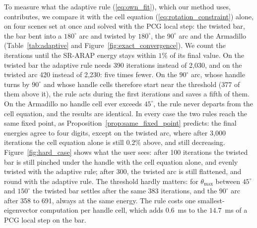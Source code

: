 \documentclass{birkjour}
\theoremstyle{remark}
\numberwithin{equation}{section}
\begin{document}
To measure what the adaptive rule (\ref{eq:own_fit}), which our method uses, contributes, we compare it with the cell equation (\ref{eq:rotation_constraint}) alone, on four scenes set at once and solved with the PCG local step: the twisted bar, the bar bent into a $180^\circ$ arc and twisted by $180^\circ$, the $90^\circ$ arc and the Armadillo (Table~\ref{tab:adaptive} and Figure~\ref{fig:exact_convergence}). We count the iterations until the SR-ARAP energy stays within $1\%$ of its final value. On the twisted bar the adaptive rule needs 390 iterations instead of 2{,}030, and on the twisted arc 420 instead of 2{,}230: five times fewer. On the $90^\circ$ arc, whose handle turns by $90^\circ$ and whose handle cells therefore start near the threshold (377 of them above it), the rule acts during the first iterations and saves a fifth of them. On the Armadillo no handle cell ever exceeds $45^\circ$, the rule never departs from the cell equation, and the results are identical. In every case the two rules reach the same fixed point, as Proposition~\ref{prop:same_fixed_point} predicts: the final energies agree to four digits, except on the twisted arc, where after 3{,}000 iterations the cell equation alone is still $0.2\%$ above, and still decreasing. Figure~\ref{fig:hard_case} shows what the user sees: after 100 iterations the twisted bar is still pinched under the handle with the cell equation alone, and evenly twisted with the adaptive rule; after 300, the twisted arc is still flattened, and round with the adaptive rule. The threshold hardly matters: for $\theta_{\max}$ between $45^\circ$ and $150^\circ$ the twisted bar settles after the same 383 iterations, and the $90^\circ$ arc after 358 to 691, always at the same energy. The rule costs one smallest-eigenvector computation per handle cell, which adds $0.6$~ms to the $14.7$~ms of a PCG local step on the bar.
\end{document}
